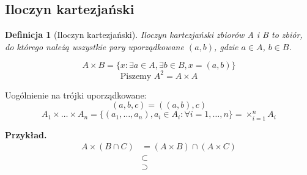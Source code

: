\documentclass[a5paper,8pt]{article}
\theoremstyle{mythmstyle}
\newtheorem{definition}{Definicja}[section]
\begin{document}

        \subsection{Iloczyn kartezjański} %
        \label{sub:iloczyn_kartezjański}
            
            \begin{definition}[Iloczyn kartezjański]
                Iloczyn kartezjański zbiorów A i B to zbiór, do którego należą wszystkie pary
                uporządkowane $ (a, b) $, gdzie $ a \in A $, $ b \in B $.

                \begin{equation*}
                    A \times B = \{ x: \exists a \in A, \exists b \in B, x = (a, b) \}
                \end{equation*}
                \begin{equation*}
                    \text{Piszemy  } A^2 = A \times A
                \end{equation*}
            \end{definition}

            Uogólnienie na trójki uporządkowane:
            \begin{equation*}
                (a, b, c) = ((a,b), c)
            \end{equation*}
            \begin{equation*}
                A_1 \times \ldots \times A_n = \{ (a_1, \ldots, a_n), a_i \in A_i 
                : \forall i = 1, \ldots, n \} = \times_{i=1}^{n} A_i
            \end{equation*}

            \textbf{Przykład.}
            \begin{align*}
                A \times (B \cap C) &= (A \times B) \cap (A \times C)\\
                & \subset \\
                & \supset
            \end{align*}
\end{document}
